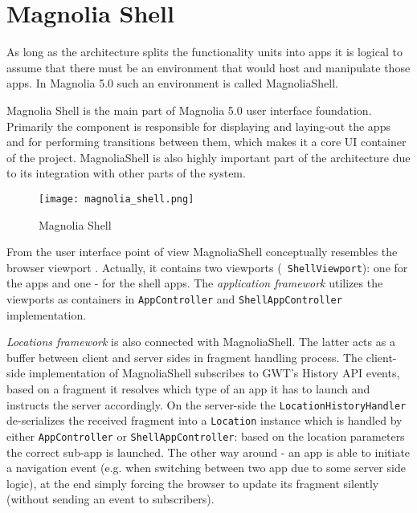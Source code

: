 \section{Magnolia Shell}
As long as the architecture splits the functionality units into apps it is
logical to assume that there must be an environment that would host and
manipulate those apps. In Magnolia 5.0 such an environment is called
MagnoliaShell.

Magnolia Shell is the main part of Magnolia 5.0 user interface foundation.
Primarily the component is responsible for displaying and laying-out the apps
and for performing transitions between them, which makes it a core UI container
of the project.
MagnoliaShell is also highly important part of the architecture due to its
integration with other parts of the system.
 

\begin{figure}[H] \centering \texttt{[image: magnolia\_shell.png]}
	\caption{Magnolia Shell}
	\label{fig:m_shell}
\end{figure}

From the user interface point of view MagnoliaShell conceptually resembles the
browser viewport \cite{mshell_wiki}.
Actually, it contains two viewports (\texttt{ ShellViewport}): one for the apps
and one - for the shell apps.
 The \emph{ application framework } utilizes the viewports as containers in
 \texttt{AppController} and \texttt{ShellAppController} implementation.

\emph{Locations framework} is also connected with MagnoliaShell. The latter acts
as a buffer between client and server sides in fragment handling process. The
client-side implementation of MagnoliaShell subscribes to GWT's History API
events, based on a fragment it resolves which type of an app it has to launch
and instructs the server accordingly. On the server-side the
\texttt{LocationHistoryHandler} de-serializes the received fragment into a
\texttt{Location} instance which is handled by either \texttt{AppController} or
\texttt{ShellAppController}: based on the location parameters the correct
sub-app is launched. The other way around - an app is able to initiate a
navigation event (e.g. when switching between two app due to some server side
logic), at the end simply forcing the browser to update its fragment silently
(without sending an event to subscribers).
